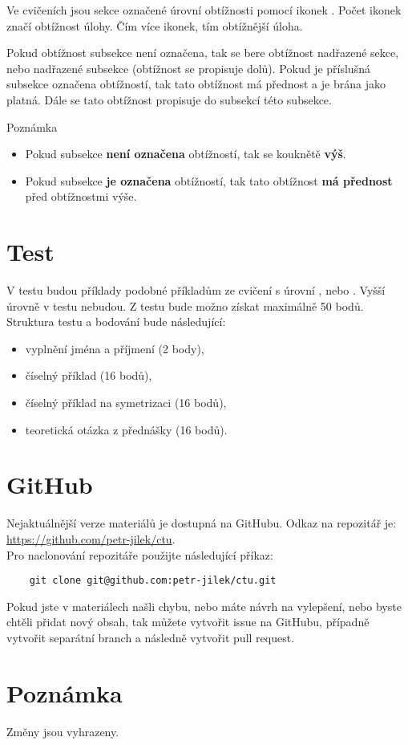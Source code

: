 \documentclass{article}
\begin{document}
Ve cvičeních jsou sekce označené úrovní obtížnosti pomocí ikonek \spicy. Počet ikonek značí obtížnost úlohy. Čím více ikonek, tím obtížnější úloha.

Pokud obtížnost subsekce není označena, tak se bere obtížnost nadřazené sekce, nebo nadřazené subsekce (obtížnost se propisuje dolů). Pokud je příslušná subsekce označena obtížností, tak tato obtížnost má přednost a je brána jako platná. Dále se tato obtížnost propisuje do subsekcí této subsekce.

\begin{notebox}{Poznámka}
    \begin{itemize}
        \item Pokud subsekce \textbf{není označena} obtížností, tak se kouknětě \textbf{výš}.
        \item Pokud subsekce \textbf{je označena} obtížností, tak tato obtížnost \textbf{má přednost} před obtížnostmi výše.
    \end{itemize}
\end{notebox}




\section{Test}
V testu budou příklady podobné příkladům ze cvičení s úrovní \spicy, nebo \spicy \spicy. Vyšší úrovně v testu nebudou. Z testu bude možno získat maximálně 50 bodů. Struktura testu a bodování bude následující:
\begin{itemize}
    \item vyplnění jména a příjmení (2 body),
    \item číselný příklad (16 bodů),
    \item číselný příklad na symetrizaci (16 bodů),
    \item teoretická otázka z přednášky (16 bodů).
\end{itemize}




\section{GitHub}
Nejaktuálnější verze materiálů je dostupná na GitHubu. Odkaz na repozitář je: \href{https://github.com/petr-jilek/ctu}{https://github.com/petr-jilek/ctu}.\\

Pro naclonování repozitáře použijte následující příkaz:

\begin{verbatim}
    git clone git@github.com:petr-jilek/ctu.git
\end{verbatim}

Pokud jste v materiálech našli chybu, nebo máte návrh na vylepšení, nebo byste chtěli přidat nový obsah, tak můžete vytvořit issue na GitHubu, případně vytvořit separátní branch a následně vytvořit pull request.




\section{Poznámka}
Změny jsou vyhrazeny.
\end{document}
